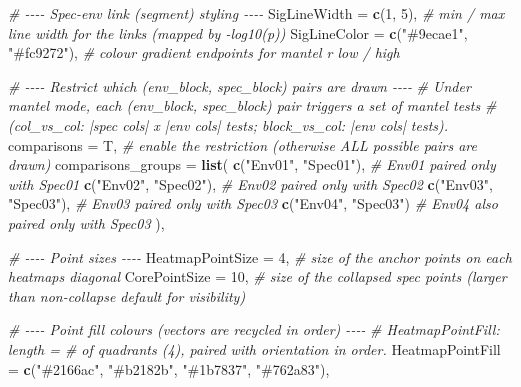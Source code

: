 \documentclass[
]{book}
\newenvironment{Shaded}{\begin{snugshade}}{\end{snugshade}}
\newcommand{\AttributeTok}[1]{\textcolor[rgb]{0.13,0.29,0.53}{#1}}
\newcommand{\CommentTok}[1]{\textcolor[rgb]{0.56,0.35,0.01}{\textit{#1}}}
\newcommand{\DecValTok}[1]{\textcolor[rgb]{0.00,0.00,0.81}{#1}}
\newcommand{\FunctionTok}[1]{\textcolor[rgb]{0.13,0.29,0.53}{\textbf{#1}}}
\newcommand{\NormalTok}[1]{#1}
\newcommand{\StringTok}[1]{\textcolor[rgb]{0.31,0.60,0.02}{#1}}
\begin{document}
\begin{Shaded}
\begin{Highlighting}[]
  \CommentTok{\# {-}{-}{-}{-} Spec{-}env link (segment) styling {-}{-}{-}{-}}
  \AttributeTok{SigLineWidth       =} \FunctionTok{c}\NormalTok{(}\DecValTok{1}\NormalTok{, }\DecValTok{5}\NormalTok{),              }\CommentTok{\# min / max line width for the links (mapped by {-}log10(p))}
  \AttributeTok{SigLineColor       =} \FunctionTok{c}\NormalTok{(}\StringTok{"\#9ecae1"}\NormalTok{, }\StringTok{"\#fc9272"}\NormalTok{),  }\CommentTok{\# colour gradient endpoints for mantel r low / high}

  \CommentTok{\# {-}{-}{-}{-} Restrict which (env\_block, spec\_block) pairs are drawn {-}{-}{-}{-}}
  \CommentTok{\# Under mantel mode, each (env\_block, spec\_block) pair triggers a set of mantel tests}
  \CommentTok{\# (col\_vs\_col: |spec cols| x |env cols| tests; block\_vs\_col: |env cols| tests).}
  \AttributeTok{comparisons        =}\NormalTok{ T,                    }\CommentTok{\# enable the restriction (otherwise ALL possible pairs are drawn)}
  \AttributeTok{comparisons\_groups =} \FunctionTok{list}\NormalTok{(}
    \FunctionTok{c}\NormalTok{(}\StringTok{"Env01"}\NormalTok{, }\StringTok{"Spec01"}\NormalTok{),                    }\CommentTok{\# Env01 paired only with Spec01}
    \FunctionTok{c}\NormalTok{(}\StringTok{"Env02"}\NormalTok{, }\StringTok{"Spec02"}\NormalTok{),                    }\CommentTok{\# Env02 paired only with Spec02}
    \FunctionTok{c}\NormalTok{(}\StringTok{"Env03"}\NormalTok{, }\StringTok{"Spec03"}\NormalTok{),                    }\CommentTok{\# Env03 paired only with Spec03}
    \FunctionTok{c}\NormalTok{(}\StringTok{"Env04"}\NormalTok{, }\StringTok{"Spec03"}\NormalTok{)                     }\CommentTok{\# Env04 also paired only with Spec03}
\NormalTok{  ),}

  \CommentTok{\# {-}{-}{-}{-} Point sizes {-}{-}{-}{-}}
  \AttributeTok{HeatmapPointSize   =} \DecValTok{4}\NormalTok{,                    }\CommentTok{\# size of the anchor points on each heatmap\textquotesingle{}s diagonal}
  \AttributeTok{CorePointSize      =} \DecValTok{10}\NormalTok{,                   }\CommentTok{\# size of the collapsed spec points (larger than non{-}collapse default for visibility)}

  \CommentTok{\# {-}{-}{-}{-} Point fill colours (vectors are recycled in order) {-}{-}{-}{-}}
  \CommentTok{\# HeatmapPointFill: length = \# of quadrants (4), paired with \textasciigrave{}orientation\textasciigrave{} in order.}
  \AttributeTok{HeatmapPointFill   =} \FunctionTok{c}\NormalTok{(}\StringTok{"\#2166ac"}\NormalTok{, }\StringTok{"\#b2182b"}\NormalTok{, }\StringTok{"\#1b7837"}\NormalTok{, }\StringTok{"\#762a83"}\NormalTok{),}


\end{Highlighting}
\end{Shaded}
\end{document}
